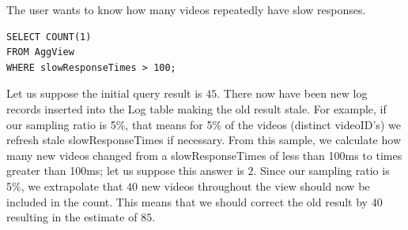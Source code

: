 The user wants to know how many videos repeatedly have slow responses.
\begin{lstlisting} 
SELECT COUNT(1)
FROM AggView
WHERE slowResponseTimes > 100;
\end{lstlisting}
Let us suppose the initial query result is $45$.
There now have been new log records inserted into the Log table making the old result stale.
For example, if our sampling ratio is 5\%, that means for 5\% of the videos (distinct videoID's) we refresh stale slowResponseTimes if necessary.
From this sample, we calculate how many new videos changed from a slowResponseTimes of less than 100ms to times greater than 100ms; let us suppose this answer is $2$.
Since our sampling ratio is 5\%, we extrapolate that $40$ new videos throughout the view should now be included in the count.
This means that we should correct the old result by $40$ resulting in the estimate of $85$.


